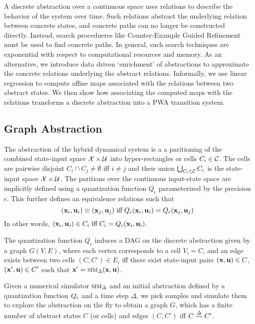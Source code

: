 
A discrete abstraction over a continuous space uses relations to
describe the behavior of the system over time. Such relations abstract
the underlying relation between concrete states, and concrete paths
can no longer be constructed directly. Instead, search procedueres
like Counter-Example Guided Refinement must be used to find concrete
paths. In general, such search techniques are exponential with respect to
computational resources and memory. As an alternative, we introduce
data driven `enrichment' of abstractions to approximate the concrete
relations underlying the abstract relations. Informally, we use linear
regression to compute affine maps associated with the relations
between two abstract states. We then show how associating the computed
maps with the relations transforms a discrete abstraction into a PWA
transition system.

\subsection{Graph Abstraction}

The abstraction of the hybrid dynamical system is a a
paritioning of the combined state-input space $\mathcal{X} \times
\mathcal{U}$ into hyper-rectangles or cells $C_i \in \mathcal{C}$. The cells are
pairwise disjoint $C_i \cap C_j \neq \emptyset$ iff $i \neq j$ and
their union $\bigcup_{C_i\in\mathcal{C}}C_i$ is the state-input
space $\mathcal{X} \times \mathcal{U}$. The paritions over
the continuous input-state space are implicitly defined using a quantization
function $Q_\epsilon$ parameterized by the precision $\epsilon$.
This further defines an equivalence relations such that
\[
    (\mathbf{x}_i, \mathbf{u}_i) \equiv (\mathbf{x}_j, \mathbf{u}_j) \;\text{iff}\; Q_\epsilon(\mathbf{x}_i,
    \mathbf{u}_i) = Q_\epsilon(\mathbf{x}_j, \mathbf{u}_j)
\]
In other words, $(\mathbf{x}_i, \mathbf{u}_i) \in C_i \; \text{iff} \; C_i =
Q_\epsilon(\mathbf{x}_i, \mathbf{u}_i)$.

\begin{definition}
    The quantization function $Q_\epsilon$ induces a DAG on the discrete
    abstraction given by a graph $G(V, E)$, where each vertex
    corresponds to a cell $V_i = C$, and an edge exists between two
    cells $(C, C') \in E_i$ iff there exist state-input pairs
    $(\mathbf{x},\mathbf{u}) \in C$, $(\mathbf{x}', \mathbf{u}) \in C'$ such that $\mathbf{x}' =
    \mbox{\sc sim}_\Delta(\mathbf{x}, \mathbf{u} )$.
\end{definition}


Given a numerical simulator $\mbox{\sc sim}_\Delta$ and an initial abstraction
defined by a quantization function $Q_\epsilon$ and a time step
$\Delta$, we pick samples and simulate them to explore the abstraction
on the fly to obtain a graph $G$, which has a finite number of
abstract states $C$ (or cells) and edges $(C,C')$ iff $C
\overset{\Delta}{\rightsquigarrow} C'$.


